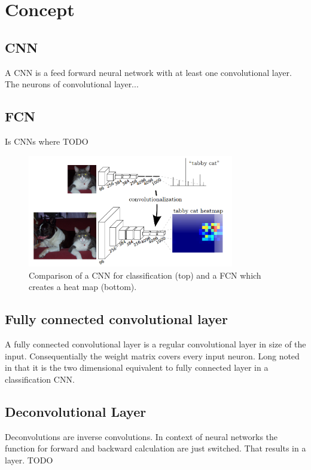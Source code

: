 \section{Concept}\label{sec:concept}
\subsection{CNN}
A \gls{CNN} is a feed forward neural network with at least one convolutional
layer. The neurons of convolutional layer...

\subsection{FCN}
Is \glspl{CNN} where TODO
\begin{figure}[htb]
	\centering
	\includegraphics[width=9cm]{figures/fcnn}
	\caption{Comparison of a \gls{CNN} for classification (top) and a \gls{FCN} which creates a heat map (bottom). \cite{long2014fully}}
\end{figure}

\subsection{Fully connected convolutional layer}
A fully connected convolutional layer is a regular convolutional layer in size
of the input. Consequentially the weight matrix covers every input neuron. Long
noted in \cite{long2014fully} that it is the two dimensional equivalent to
fully connected layer in a classification \gls{CNN}.

\subsection{Deconvolutional Layer}
Deconvolutions are inverse convolutions. In context of neural networks the
function for forward and backward calculation are just switched. That results
in a layer. TODO
